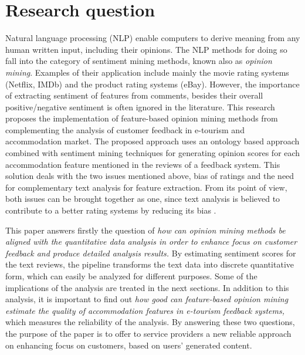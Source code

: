 \section{Research question}
Natural language processing (NLP) enable computers to derive meaning from any human written input, including their opinions. The NLP methods for doing so fall into the category of sentiment mining methods, known also as \textit{opinion mining}. Examples of their application include mainly the movie rating systems (Netflix, IMDb) and the product rating systems (eBay). However, the importance of extracting sentiment of features from comments, besides their overall positive/negative sentiment is often ignored in the literature. This research proposes the implementation of feature-based opinion mining methods from complementing the analysis of customer feedback in e-tourism and accommodation market. The proposed approach uses an ontology based approach combined with sentiment mining techniques for generating opinion scores for each accommodation feature mentioned in the reviews of a feedback system. This solution deals with the two issues mentioned above, bias of ratings and the need for complementary text analysis for feature extraction. From its point of view, both issues can be brought together as one, since text analysis is believed to contribute to a better rating systems by reducing its bias \cite{fradkin2016bias}.

This paper answers firstly the question of \textit{how can opinion mining methods be aligned with the quantitative data analysis in order to enhance focus on customer feedback and produce detailed analysis results.} By estimating sentiment scores for the text reviews, the pipeline transforms the text data into discrete quantitative form, which can easily be analyzed for different purposes. Some of the implications of the analysis are treated in the next sections. In addition to this analysis, it is important to find out \textit{how good can feature-based opinion mining estimate the quality of accommodation features in e-tourism feedback systems,} which measures the reliability of the analysis. By answering these two questions, the purpose of the paper is to offer to service providers a new reliable approach on enhancing focus on customers, based on users' generated content.

